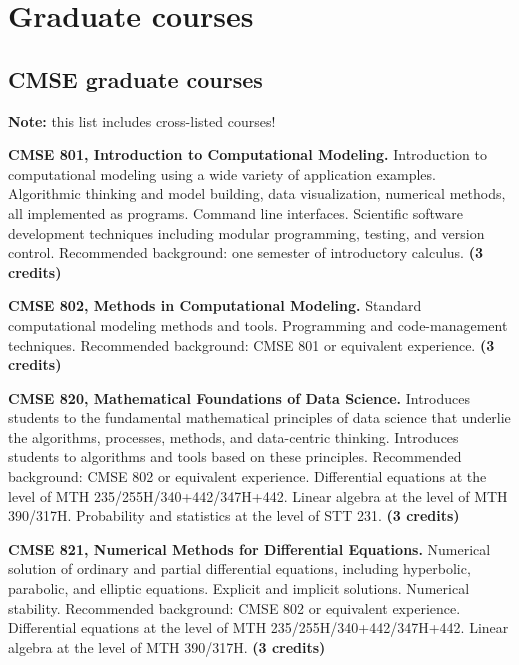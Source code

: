 \section{Graduate courses}
\label{sec:courses}

\subsection{CMSE graduate courses}

\textbf{Note:} this list includes cross-listed courses!

\vspace{3mm}
\noindent
\textbf{CMSE 801, Introduction to Computational Modeling.}
Introduction to computational modeling using a wide variety of
application examples. Algorithmic thinking and model building, data
visualization, numerical methods, all implemented as programs. Command
line interfaces. Scientific software development techniques including
modular programming, testing, and version control.  Recommended
background: one semester of introductory calculus.  \textbf{(3
  credits)}

\vspace{3mm}
\noindent
\textbf{CMSE 802, Methods in Computational Modeling.}
Standard computational modeling methods and tools. Programming and
code-management techniques.  Recommended background:  CMSE 801 or
equivalent experience.  \textbf{(3 credits)}  


\vspace{3mm}
\noindent
\textbf{CMSE 820, Mathematical Foundations of Data Science.}
Introduces students to the fundamental mathematical principles of data
science that underlie the algorithms, processes, methods, and
data-centric thinking. Introduces students to algorithms and tools
based on these principles.  Recommended background:  CMSE 802 or
equivalent experience.  Differential equations at the level of MTH
235/255H/340+442/347H+442.  Linear algebra at the level of MTH
390/317H.  Probability and statistics at the level of STT 231.
\textbf{(3 credits)}


\vspace{3mm}
\noindent
\textbf{CMSE 821, Numerical Methods for Differential
Equations.}  Numerical solution of ordinary and partial differential
equations, including hyperbolic, parabolic, and elliptic
equations. Explicit and implicit solutions. Numerical stability.
Recommended background: CMSE 802 or equivalent experience.
Differential equations at the level of MTH 235/255H/340+442/347H+442.
Linear algebra at the level of MTH 390/317H.  \textbf{(3 credits)}


